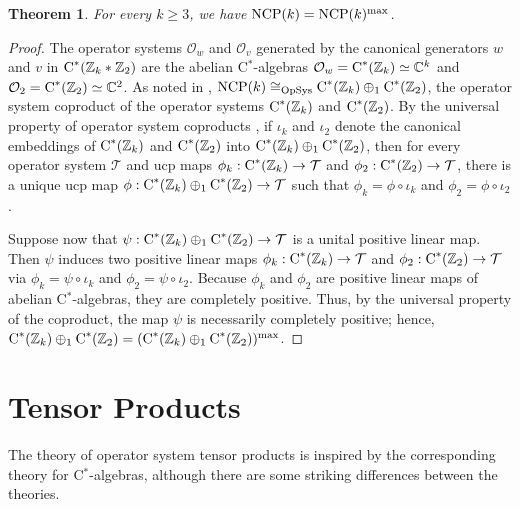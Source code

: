 \documentclass{amsart}
\newtheorem{theorem}{Theorem}[section]
\theoremstyle{definition}
\theoremstyle{remark}
\newcommand\ost{{\mathcal T}}
\newcommand\cstar{{\textrm C}^*}                              %
\numberwithin{equation}{section}
\begin{document}
\begin{theorem}\label{omax} For every $k\geq 3$, we have
$\mbox{\textrm{NCP}}(k)=\mbox{\textrm{NCP}}(k)^{\textrm{max}}$.
\end{theorem}

\begin{proof} The operator systems $\mathcal O_w$ and $\mathcal O_v$ generated by the canonical generators $w$ and $v$ in 
$\cstar(\mathbb Z_k*\mathbb Z_2)$ are the abelian C$^*$-algebras
 $\mathcal O_w=\cstar(\mathbb Z_k)\simeq\mathbb C^k$ and $\mathcal O_2=\cstar(\mathbb Z_2)\simeq\mathbb C^2$.
As noted in \cite[\S5]{farenick--kavruk--paulsen--todorov2018}, $\mbox{\textrm{NCP}}(k)\cong_{\textrm{OpSys}}\cstar(\mathbb Z_k)\oplus_1 \cstar(\mathbb Z_2)$,
the operator system coproduct of the operator systems $\cstar(\mathbb Z_k)$ and 
$\cstar(\mathbb Z_2)$.
By the universal property of operator system coproducts \cite{farenick--kavruk--paulsen--todorov2018},
if $\iota_k$ and $\iota_2$ denote the canonical embeddings of 
$\cstar(\mathbb Z_k)$ and 
$\cstar(\mathbb Z_2)$ into $\cstar(\mathbb Z_k)\oplus_1 \cstar(\mathbb Z_2)$, 
then for every operator system $\ost$ and ucp maps $\phi_k:\cstar(\mathbb Z_k)\rightarrow\ost$ and $\phi_2:\cstar(\mathbb Z_2)\rightarrow\ost$,
there is a unique ucp map $\phi:\cstar(\mathbb Z_k)\oplus_1 \cstar(\mathbb Z_2)\rightarrow\ost$ such that $\phi_k=\phi\circ\iota_k$ and 
$\phi_2=\phi\circ\iota_2$.

Suppose now that $\psi:\cstar(\mathbb Z_k)\oplus_1 \cstar(\mathbb Z_2)\rightarrow\ost$ is a unital positive linear map. Then $\psi$ induces two positive linear maps
$\phi_k:\cstar(\mathbb Z_k)\rightarrow\ost$ and $\phi_2:\cstar(\mathbb Z_2)\rightarrow\ost$ via $\phi_k=\psi\circ\iota_k$ and 
$\phi_2=\psi\circ\iota_2$. Because $\phi_k$ and $\phi_2$ are positive linear maps of abelian C$^*$-algebras, they are completely
positive. Thus, by the universal property of the coproduct, the map $\psi$ is necessarily completely positive; hence,
$\cstar(\mathbb Z_k)\oplus_1 \cstar(\mathbb Z_2)=(\cstar(\mathbb Z_k)\oplus_1 \cstar(\mathbb Z_2))^{\textrm{max}}$.
\end{proof}


\section{Tensor Products}

The theory of operator system tensor products \cite{kavruk--paulsen--todorov--tomforde2011}
is inspired by the corresponding theory for C$^*$-algebras, although there are some striking differences between the theories. 
\end{document}
